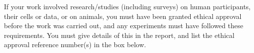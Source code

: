 {        If your work involved research/studies (including surveys) on human participants, their cells or data, or on animals, you must have been granted ethical approval before the work was carried out, and any experiments must have followed these requirements. You must give details of this in the report, and list the ethical approval reference number(s) in the box below.

        \noindent{}
    
    }
